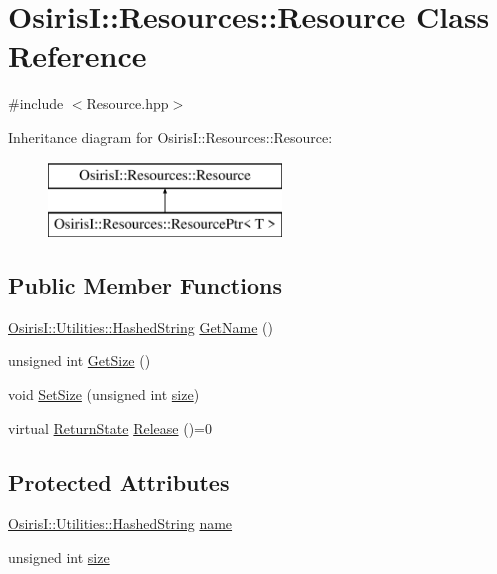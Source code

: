 \hypertarget{class_osiris_i_1_1_resources_1_1_resource}{\section{Osiris\-I\-:\-:Resources\-:\-:Resource Class Reference}
\label{class_osiris_i_1_1_resources_1_1_resource}
}


{\ttfamily \#include $<$Resource.\-hpp$>$}

Inheritance diagram for Osiris\-I\-:\-:Resources\-:\-:Resource\-:\begin{figure}[H]
\begin{center}
\leavevmode
\includegraphics[height=2.000000cm]{class_osiris_i_1_1_resources_1_1_resource}
\end{center}
\end{figure}
\subsection*{Public Member Functions}
\begin{DoxyCompactItemize}
\item 
\hyperlink{class_osiris_i_1_1_utilities_1_1_hashed_string}{Osiris\-I\-::\-Utilities\-::\-Hashed\-String} \hyperlink{class_osiris_i_1_1_resources_1_1_resource_a71ec16099a80163f4ce95c2860f843eb}{Get\-Name} ()
\item 
unsigned int \hyperlink{class_osiris_i_1_1_resources_1_1_resource_a75f77fc0d25d7206e021819946e09977}{Get\-Size} ()
\item 
void \hyperlink{class_osiris_i_1_1_resources_1_1_resource_a074d3dc9333a64a0a0a980a7b279e0e7}{Set\-Size} (unsigned int \hyperlink{class_osiris_i_1_1_resources_1_1_resource_a9c11fd6cff9340335e6c6a34c0651872}{size})
\item 
virtual \hyperlink{namespace_osiris_i_a8f53bf938dc75c65c6a529694514013e}{Return\-State} \hyperlink{class_osiris_i_1_1_resources_1_1_resource_a460fe4c275f1f4b56dfb4cae27cc3bb6}{Release} ()=0
\end{DoxyCompactItemize}
\subsection*{Protected Attributes}
\begin{DoxyCompactItemize}
\item 
\hyperlink{class_osiris_i_1_1_utilities_1_1_hashed_string}{Osiris\-I\-::\-Utilities\-::\-Hashed\-String} \hyperlink{class_osiris_i_1_1_resources_1_1_resource_aa7c3c8ca629d90f7ebaa7e0fa5081bac}{name}
\item 
unsigned int \hyperlink{class_osiris_i_1_1_resources_1_1_resource_a9c11fd6cff9340335e6c6a34c0651872}{size}
\end{DoxyCompactItemize}


